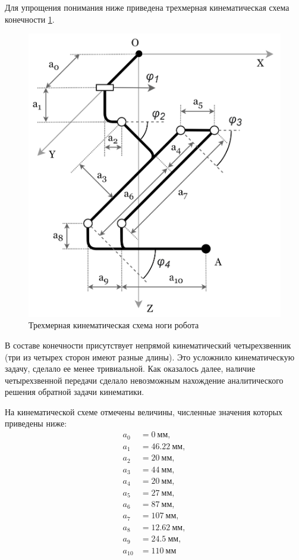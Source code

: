 Для упрощения понимания ниже приведена трехмерная кинематическая схема конечности \ref{fig:kin_scheme}.
\begin{figure}[h] %
    \centering
    \includegraphics[scale=1.3]{chapter_kinematics/figure1.png}
    \caption{Трехмерная кинематическая схема ноги робота}
    \label{fig:kin_scheme}
\end{figure}

В составе конечности присутствует непрямой кинематический четырехзвенник (три из четырех сторон имеют разные длины). Это усложнило кинематическую задачу, сделало ее менее тривиальной. Как оказалось далее, наличие четырехзвенной передачи сделало невозможным нахождение аналитического решения обратной задачи кинематики. 

На кинематической схеме отмечены величины, численные значения которых приведены ниже:
\begin{align*} %
    a_0&=0 \: мм, \\
    a_1&=46.22 \: мм, \\
    a_2&=20 \: мм, \\
    a_3&=44 \: мм, \\
    a_4&=20 \: мм, \\
    a_5&=27 \: мм, \\
    a_6&=87 \: мм, \\
    a_7&=107 \: мм, \\
    a_8&=12.62 \: мм, \\
    a_9&=24.5 \:  мм, \\
    a_{10}&=110  \: мм
\end{align*}

